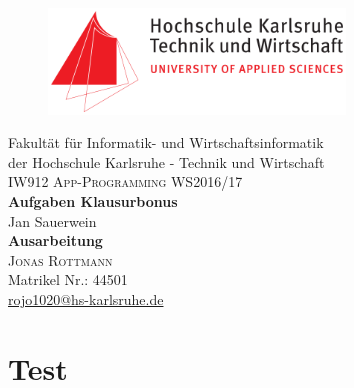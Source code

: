 \documentclass[11pt, oneside]{article}
\begin{document}
\hypersetup{pageanchor=false}
\thispagestyle{empty}

\begin{figure}
\centering
\includegraphics[height=80pt]{hska_logo.png}
\end{figure}

\begin{center}

\large{Fakultät für Informatik- und Wirtschaftsinformatik \\
der Hochschule Karlsruhe - Technik und Wirtschaft \\}
\vspace{5mm}
\large{\textsc{IW912 App-Programming WS2016/17}} \\
\vspace{3mm}
\fontsize{16pt}{7pt}\selectfont\textbf{Aufgaben Klausurbonus} \\
\vspace{5mm}
Jan Sauerwein\\
\vspace{10mm}
\large{\textbf{Ausarbeitung}} \\
\vspace{10mm}
\textsc{Jonas Rottmann}\\
Matrikel Nr.: 44501\\
\href{mailto:rojo1020@hs-karlsruhe.de}{rojo1020@hs-karlsruhe.de}\\[2mm]

\end{center}
\newpage


\tableofcontents %
\newpage


\section{Test}
\end{document}
